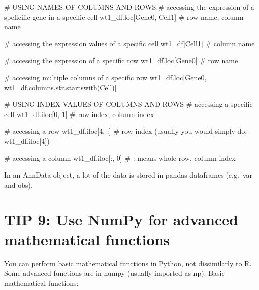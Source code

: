 \documentclass[
  letterpaper,
  DIV=11,
  numbers=noendperiod]{scrartcl}
\newenvironment{Shaded}{\begin{snugshade}}{\end{snugshade}}
\newcommand{\BuiltInTok}[1]{\textcolor[rgb]{0.00,0.23,0.31}{#1}}
\newcommand{\CommentTok}[1]{\textcolor[rgb]{0.37,0.37,0.37}{#1}}
\newcommand{\DecValTok}[1]{\textcolor[rgb]{0.68,0.00,0.00}{#1}}
\newcommand{\NormalTok}[1]{\textcolor[rgb]{0.00,0.23,0.31}{#1}}
\newcommand{\StringTok}[1]{\textcolor[rgb]{0.13,0.47,0.30}{#1}}
\begin{document}
\begin{Shaded}
\begin{Highlighting}[]
\CommentTok{\# USING NAMES OF COLUMNS AND ROWS}
\CommentTok{\# accessing the expression of a speficific gene in a specific cell}
\NormalTok{wt1\_df.loc[}\StringTok{\textquotesingle{}Gene0\textquotesingle{}}\NormalTok{, }\StringTok{\textquotesingle{}Cell1\textquotesingle{}}\NormalTok{] }\CommentTok{\# row name, column name}

\CommentTok{\# accessing the expression values of a specific cell}
\NormalTok{wt1\_df[}\StringTok{\textquotesingle{}Cell1\textquotesingle{}}\NormalTok{] }\CommentTok{\# column name}

\CommentTok{\# accessing the expression of a specific row}
\NormalTok{wt1\_df.loc[}\StringTok{\textquotesingle{}Gene0\textquotesingle{}}\NormalTok{] }\CommentTok{\# row name}

\CommentTok{\# accessing multiple columns of a specific row}
\NormalTok{wt1\_df.loc[}\StringTok{\textquotesingle{}Gene0\textquotesingle{}}\NormalTok{, wt1\_df.columns.}\BuiltInTok{str}\NormalTok{.startswith(}\StringTok{\textquotesingle{}Cell\textquotesingle{}}\NormalTok{)]}


\CommentTok{\# USING INDEX VALUES OF COLUMNS AND ROWS}
\CommentTok{\# accessing a specific cell }
\NormalTok{wt1\_df.iloc[}\DecValTok{0}\NormalTok{, }\DecValTok{1}\NormalTok{] }\CommentTok{\# row index, column index}

\CommentTok{\# accessing a row}
\NormalTok{wt1\_df.iloc[}\DecValTok{4}\NormalTok{, :] }\CommentTok{\# row index (usually you would simply do: wt1\_df.iloc[4])}

\CommentTok{\# accessing a column}
\NormalTok{wt1\_df.iloc[:, }\DecValTok{0}\NormalTok{] }\CommentTok{\# : means whole row, column index}
\end{Highlighting}
\end{Shaded}

In an AnnData object, a lot of the data is stored in pandas dataframes
(e.g.~var and obs).

\section{TIP 9: Use NumPy for advanced mathematical
functions}\label{tip-9-use-numpy-for-advanced-mathematical-functions}

You can perform basic mathematical functions in Python, not dissimilarly
to R. Some advanced functions are in numpy (usually imported as np).
Basic mathematical functions:
\end{document}

